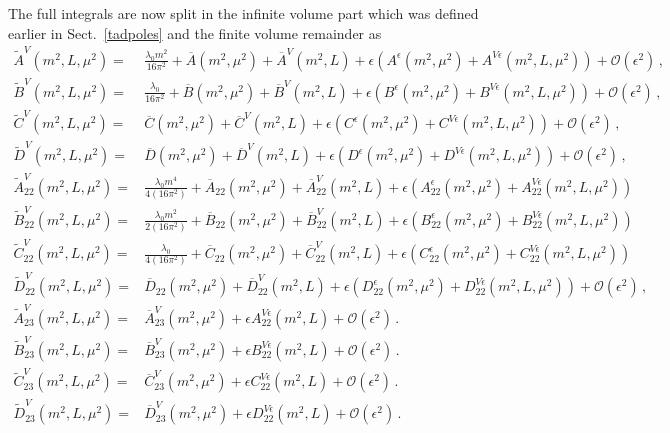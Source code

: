 \documentclass[12pt,a4paper]{article}
\begin{document}
The full integrals are now split in the infinite volume part
which was defined earlier in Sect.~\ref{tadpoles} and the finite volume
remainder as
\begin{align}
\tilde A^V(m^2,L,\mu^2)\!
=&\frac{\lambda_0 m^2}{16\pi^2}
  +\overline A(m^2,\mu^2)+\overline A^V(m^2,L)
  +\epsilon\left(A^\epsilon(m^2,\mu^2)+A^{V\epsilon}(m^2,L,\mu^2)
     \right)
  +\mathcal{O}(\epsilon^2)\,,
\nonumber\\
\tilde B^V(m^2,L,\mu^2)\!
=&\frac{\lambda_0}{16\pi^2}
  +\overline B(m^2,\mu^2)+\overline B^V(m^2,L)
  +\epsilon\left(B^\epsilon(m^2,\mu^2)+B^{V\epsilon}(m^2,L,\mu^2)
     \right)
  +\mathcal{O}(\epsilon^2)\,,
\nonumber\\
\tilde C^V(m^2,L,\mu^2)\!
=&\overline C(m^2,\mu^2)+\overline C^V(m^2,L)
  +\epsilon\left(C^\epsilon(m^2,\mu^2)+C^{V\epsilon}(m^2,L,\mu^2)
     \right)
  +\mathcal{O}(\epsilon^2)\,,
\nonumber\\
\tilde D^V(m^2,L,\mu^2)\!
=&\overline D(m^2,\mu^2)+\overline D^V(m^2,L)
  +\epsilon\left(D^\epsilon(m^2,\mu^2)+D^{V\epsilon}(m^2,L,\mu^2)
     \right)
  +\mathcal{O}(\epsilon^2)\,,
\nonumber\\
\tilde A^V_{22}(m^2,L,\mu^2)\!
=&\frac{\lambda_0 m^4}{4(16\pi^2)}
  +\overline A_{22}(m^2,\mu^2)+\overline A^V_{22}(m^2,L)
  +\epsilon\left(A^\epsilon_{22}(m^2,\mu^2)+A^{V\epsilon}_{22}(m^2,L,\mu^2)
     \right)
\nonumber\\
\tilde B^V_{22}(m^2,L,\mu^2)\!
=&\frac{\lambda_0 m^2}{2(16\pi^2)}
  +\overline B_{22}(m^2,\mu^2)+\overline B^V_{22}(m^2,L)
  +\epsilon\left(B^\epsilon_{22}(m^2,\mu^2)+B^{V\epsilon}_{22}(m^2,L,\mu^2)
     \right)
\nonumber\\
\tilde C^V_{22}(m^2,L,\mu^2)\!
=&\frac{\lambda_0}{4(16\pi^2)}
  +\overline C_{22}(m^2,\mu^2)+\overline C^V_{22}(m^2,L)
  +\epsilon\left(C^\epsilon_{22}(m^2,\mu^2)+C^{V\epsilon}_{22}(m^2,L,\mu^2)
     \right)
\nonumber\\
\tilde D^V_{22}(m^2,L,\mu^2)\!
=&\overline D_{22}(m^2,\mu^2)+\overline D^V_{22}(m^2,L)
  +\epsilon\left(D^\epsilon_{22}(m^2,\mu^2)+D^{V\epsilon}_{22}(m^2,L,\mu^2)
     \right)
  +\mathcal{O}(\epsilon^2)\,,
\nonumber\\
\tilde A^V_{23}(m^2,L,\mu^2)
=&\overline A^V_{23}(m^2,\mu^2)
  +\epsilon A^{V\epsilon}_{22}(m^2,L)
  +\mathcal{O}(\epsilon^2)\,.
\nonumber\\
\tilde B^V_{23}(m^2,L,\mu^2)
=&\overline B^V_{23}(m^2,\mu^2)
  +\epsilon B^{V\epsilon}_{22}(m^2,L)
  +\mathcal{O}(\epsilon^2)\,.
\nonumber\\
\tilde C^V_{23}(m^2,L,\mu^2)
=&\overline C^V_{23}(m^2,\mu^2)
  +\epsilon C^{V\epsilon}_{22}(m^2,L)
  +\mathcal{O}(\epsilon^2)\,.
\nonumber\\
\tilde D^V_{23}(m^2,L,\mu^2)
=&\overline D^V_{23}(m^2,\mu^2)
  +\epsilon D^{V\epsilon}_{22}(m^2,L)
  +\mathcal{O}(\epsilon^2)\,.
\end{align}
\end{document}

